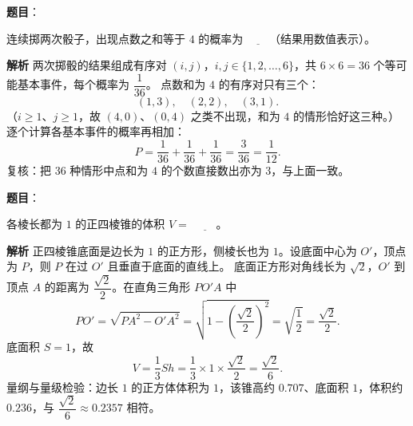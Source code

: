 \begin{answer}

\textbf{题目}：

连续掷两次骰子，出现点数之和等于 $4$ 的概率为 $\underline{\qquad}$（结果用数值表示）。

\textbf{解析}
两次掷骰的结果组成有序对 $(i,j)$，$i,j\in\{1,2,\dots,6\}$，共 $6\times6=36$ 个等可能基本事件，每个概率为 $\dfrac1{36}$。
点数和为 $4$ 的有序对只有三个：
\nopagebreak[4]
\[(1,3),\quad(2,2),\quad(3,1).\]
（$i\ge1$、$j\ge1$，故 $(4,0)$、$(0,4)$ 之类不出现，和为 $4$ 的情形恰好这三种。）
逐个计算各基本事件的概率再相加：
\nopagebreak[4]
\[P=\frac1{36}+\frac1{36}+\frac1{36}=\frac3{36}=\frac1{12}.\]
复核：把 $36$ 种情形中点和为 $4$ 的个数直接数出亦为 $3$，与上面一致。


\end{answer}
\begin{answer}

\textbf{题目}：

各棱长都为 $1$ 的正四棱锥的体积 $V=$ $\underline{\qquad}$。

\textbf{解析}
正四棱锥底面是边长为 $1$ 的正方形，侧棱长也为 $1$。设底面中心为 $O'$，顶点为 $P$，则 $P$ 在过 $O'$ 且垂直于底面的直线上。
底面正方形对角线长为 $\sqrt2$，$O'$ 到顶点 $A$ 的距离为 $\dfrac{\sqrt2}{2}$。在直角三角形 $PO'A$ 中
\nopagebreak[4]
\[PO'=\sqrt{PA^2-O'A^2}=\sqrt{1-\left(\frac{\sqrt2}{2}\right)^2}=\sqrt{\frac12}=\frac{\sqrt2}{2}.\]
底面积 $S=1$，故
\nopagebreak[4]
\[V=\frac13Sh=\frac13\times1\times\frac{\sqrt2}{2}=\frac{\sqrt2}{6}.\]
量纲与量级检验：边长 $1$ 的正方体体积为 $1$，该锥高约 $0.707$、底面积 $1$，体积约 $0.236$，与 $\dfrac{\sqrt2}{6}\approx0.2357$ 相符。


\end{answer}
